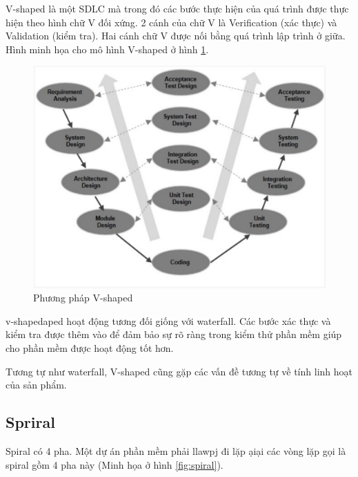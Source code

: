 \documentclass{article}
\begin{document}
V-shaped là một SDLC mà trong đó các bước thực hiện của quá trình được thực hiện theo hình chữ V đối xứng. 2 cánh của chữ V là Verification (xác thực) và Validation (kiểm tra). Hai cánh chữ V được nối bằng quá trình lập trình ở giữa. Hình minh họa cho mô hình V-shaped ở hình \ref{fig:vshape}. 


\begin{figure}[h]
	\centering
	\includegraphics[scale=0.3]{figures/vshape.png}
	\caption{Phương pháp V-shaped \cite{tutorialspointvs}}
	\label{fig:vshape}
\end{figure}

v-shapedaped hoạt động tương đối giống với waterfall. Các bước xác thực và kiểm tra được thêm vào để đảm bảo sự rõ ràng trong kiểm thử phần mềm giúp cho phần mềm được hoạt động tốt hơn.

Tương tự như waterfall, V-shaped cũng gặp các vấn đề tương tự về tính linh hoạt của sản phẩm.

\subsection{Spriral}

Spiral có 4 pha. Một dự án phần mềm phải llawpj đi lặp ạiại các vòng lặp gọi là spiral gồm 4 pha này (Minh họa ở hình \ref{fig:spiral}).
\end{document}
